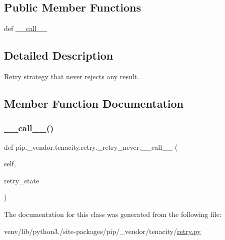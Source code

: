 \subsection*{Public Member Functions}
\begin{DoxyCompactItemize}
\item 
def \hyperlink{classpip_1_1__vendor_1_1tenacity_1_1retry_1_1__retry__never_abfe51ce483800ddde769fe114965b92d}{\+\_\+\+\_\+call\+\_\+\+\_\+}
\end{DoxyCompactItemize}


\subsection{Detailed Description}
\begin{DoxyVerb}Retry strategy that never rejects any result.\end{DoxyVerb}
 

\subsection{Member Function Documentation}
\mbox{\label{classpip_1_1__vendor_1_1tenacity_1_1retry_1_1__retry__never_abfe51ce483800ddde769fe114965b92d}} 
\subsubsection{\texorpdfstring{\+\_\+\+\_\+call\+\_\+\+\_\+()}{\_\_call\_\_()}}
{\footnotesize\ttfamily def pip.\+\_\+vendor.\+tenacity.\+retry.\+\_\+retry\+\_\+never.\+\_\+\+\_\+call\+\_\+\+\_\+ (\begin{DoxyParamCaption}\item[{}]{self,  }\item[{}]{retry\+\_\+state }\end{DoxyParamCaption})}



The documentation for this class was generated from the following file\+:\begin{DoxyCompactItemize}
\item 
venv/lib/python3./site-\/packages/pip/\+\_\+vendor/tenacity/\hyperlink{tenacity_2retry_8py}{retry.\+py}\end{DoxyCompactItemize}
